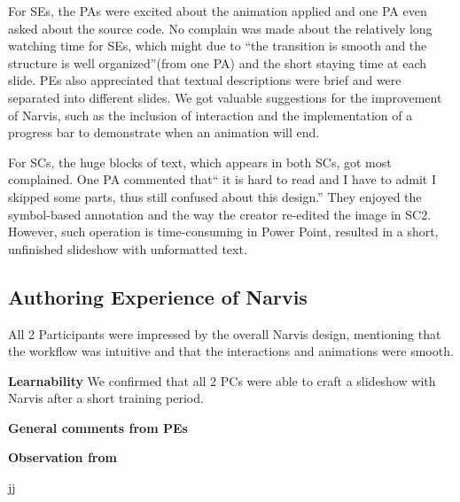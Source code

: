 For SEs, the PAs were excited about the animation applied and one PA even asked about the source code. No complain was made about the relatively long watching time for SEs, which might due to ``the transition is smooth and the structure is well organized''(from one PA) and the short staying time at each slide. PEs also appreciated that textual descriptions were brief and were separated into different slides.
We got valuable suggestions for the improvement of Narvis, such as the inclusion of interaction and the implementation of a progress bar to demonstrate when an animation will end. 

For SCs, the huge blocks of text, which appears in both SCs, got most complained. 
One PA commented that`` it is hard to read and I have to admit I skipped some parts, thus still confused about this design.'' They enjoyed the symbol-based annotation and the way the creator re-edited the image in SC2. However, such operation is time-consuming in Power Point, resulted in a short, unfinished slideshow with unformatted text. 


\subsection{Authoring Experience of Narvis}
All 2 Participants were impressed by the overall Narvis design, mentioning that the workflow was intuitive and that the interactions and animations were smooth. 

\noindent
\textbf{Learnability}
We confirmed that all 2 PCs were able to craft a slideshow with Narvis after a short training period. 

\noindent
\textbf{General comments from PEs}

\noindent
\textbf{Observation from }

jj